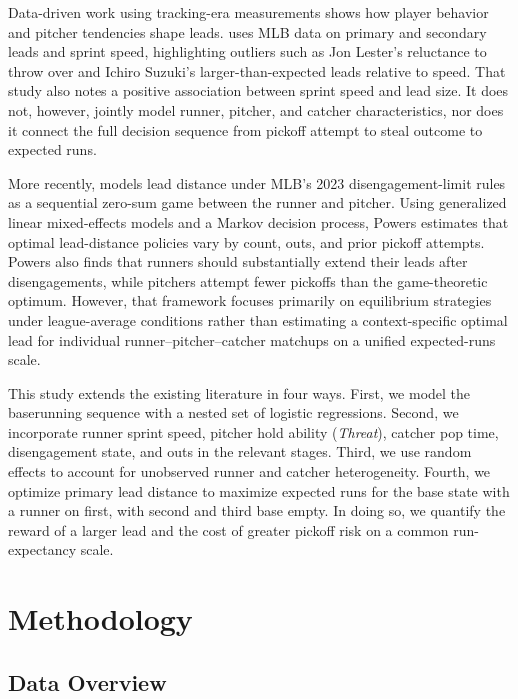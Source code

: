 \documentclass[12pt,letterpaper]{article}
\begin{document}
Data-driven work using tracking-era measurements shows how player behavior and pitcher tendencies shape leads. \citet{Lindbergh2015Statcast} uses MLB data on primary and secondary leads and sprint speed, highlighting outliers such as Jon Lester's reluctance to throw over and Ichiro Suzuki's larger-than-expected leads relative to speed. That study also notes a positive association between sprint speed and lead size. It does not, however, jointly model runner, pitcher, and catcher characteristics, nor does it connect the full decision sequence from pickoff attempt to steal outcome to expected runs.

More recently, \citet{Powers2026SequentialGameModel} models lead distance under MLB's 2023 disengagement-limit rules as a sequential zero-sum game between the runner and pitcher. Using generalized linear mixed-effects models and a Markov decision process, Powers estimates that optimal lead-distance policies vary by count, outs, and prior pickoff attempts. Powers also finds that runners should substantially extend their leads after disengagements, while pitchers attempt fewer pickoffs than the game-theoretic optimum. However, that framework focuses primarily on equilibrium strategies under league-average conditions rather than estimating a context-specific optimal lead for individual runner--pitcher--catcher matchups on a unified expected-runs scale.

This study extends the existing literature in four ways. First, we model the baserunning sequence with a nested set of logistic regressions. Second, we incorporate runner sprint speed, pitcher hold ability (\emph{Threat}), catcher pop time, disengagement state, and outs in the relevant stages. Third, we use random effects to account for unobserved runner and catcher heterogeneity. Fourth, we optimize primary lead distance to maximize expected runs for the base state with a runner on first, with second and third base empty. In doing so, we quantify the reward of a larger lead and the cost of greater pickoff risk on a common run-expectancy scale.

\section{Methodology}

\subsection{Data Overview}
\end{document}
